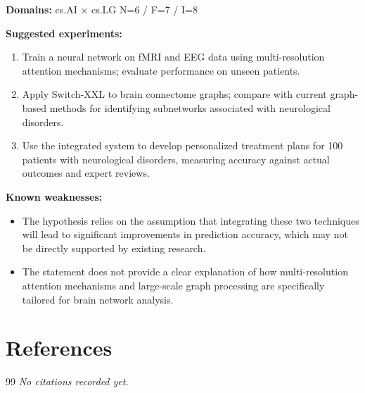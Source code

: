 \documentclass[12pt,a4paper]{article}
\begin{document}
\noindent\textbf{Domains:} cs.AI $\times$ cs.LG
\hspace{1em} N=6 / F=7 / I=8

\textbf{Suggested experiments:}
\begin{enumerate}
  \item Train a neural network on fMRI and EEG data using multi-resolution attention mechanisms; evaluate performance on unseen patients.
  \item Apply Switch-XXL to brain connectome graphs; compare with current graph-based methods for identifying subnetworks associated with neurological disorders.
  \item Use the integrated system to develop personalized treatment plans for 100 patients with neurological disorders, measuring accuracy against actual outcomes and expert reviews.
\end{enumerate}

\textbf{Known weaknesses:}
\begin{itemize}
  \item The hypothesis relies on the assumption that integrating these two techniques will lead to significant improvements in prediction accuracy, which may not be directly supported by existing research.
  \item The statement does not provide a clear explanation of how multi-resolution attention mechanisms and large-scale graph processing are specifically tailored for brain network analysis.
\end{itemize}


\section{References}

\begin{thebibliography}{99}
\textit{No citations recorded yet.}
\end{thebibliography}
\end{document}
